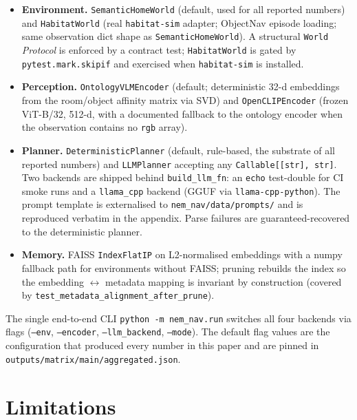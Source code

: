 \documentclass[conference,a4paper,10pt]{IEEEtran}
\begin{document}
\begin{itemize}[leftmargin=*]
\item \textbf{Environment.} \texttt{SemanticHomeWorld} (default,
  used for all reported numbers) and \texttt{HabitatWorld} (real
  \texttt{habitat-sim} adapter; ObjectNav episode loading; same
  observation dict shape as \texttt{SemanticHomeWorld}). A structural
  \texttt{World} \emph{Protocol} is enforced by a contract test;
  \texttt{HabitatWorld} is gated by \texttt{pytest.mark.skipif} and
  exercised when \texttt{habitat-sim} is installed.

\item \textbf{Perception.} \texttt{OntologyVLMEncoder} (default;
  deterministic 32-d embeddings from the room/object affinity matrix
  via SVD) and \texttt{OpenCLIPEncoder} (frozen ViT-B/32, 512-d, with a
  documented fallback to the ontology encoder when the observation
  contains no \texttt{rgb} array).

\item \textbf{Planner.} \texttt{DeterministicPlanner} (default,
  rule-based, the substrate of all reported numbers) and
  \texttt{LLMPlanner} accepting any \texttt{Callable[[str], str]}.
  Two backends are shipped behind \texttt{build\_llm\_fn}: an
  \texttt{echo} test-double for CI smoke runs and a
  \texttt{llama\_cpp} backend (GGUF via \texttt{llama-cpp-python}). The
  prompt template is externalised to \texttt{nem\_nav/data/prompts/}
  and is reproduced verbatim in the appendix. Parse failures are
  guaranteed-recovered to the deterministic planner.

\item \textbf{Memory.} FAISS \texttt{IndexFlatIP} on L2-normalised
  embeddings with a numpy fallback path for environments without FAISS;
  pruning rebuilds the index so the embedding $\leftrightarrow$
  metadata mapping is invariant by construction (covered by
  \texttt{test\_metadata\_alignment\_after\_prune}).
\end{itemize}

The single end-to-end CLI \texttt{python -m nem\_nav.run} switches all
four backends via flags (\texttt{--env}, \texttt{--encoder},
\texttt{--llm\_backend}, \texttt{--mode}). The default flag values are
the configuration that produced every number in this paper and are
pinned in \texttt{outputs/matrix/main/aggregated.json}.

\section{Limitations}
\label{sec:limitations}
\end{document}
